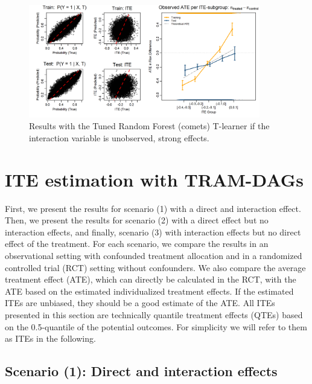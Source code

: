 \begin{figure}[htbp]
\centering
\includegraphics[width=0.9\textwidth]{img/results_ITE_simulation/unobserved_interaction_tuned_rf_tlearner.png}
\caption{Results with the Tuned Random Forest (comets) T-learner if the interaction variable is unobserved, strong effects.}
\label{fig:unobserved_interaction_glm_tlearner}
\end{figure}


\section{ITE estimation with TRAM-DAGs}

First, we present the results for scenario (1) with a direct and interaction effect. Then, we present the results for scenario (2) with a direct effect but no interaction effects, and finally, scenario (3) with interaction effects but no direct effect of the treatment. For each scenario, we compare the results in an observational setting with confounded treatment allocation and in a randomized controlled trial (RCT) setting without confounders. We also compare the average treatment effect (ATE), which can directly be calculated in the RCT, with the ATE based on the estimated individualized treatment effects. If the estimated ITEs are unbiased, they should be a good estimate of the ATE. All ITEs presented in this section are technically quantile treatment effects (QTEs) based on the 0.5-quantile of the potential outcomes. For simplicity we will refer to them as ITEs in the following.


\subsection{Scenario (1): Direct and interaction effects}

